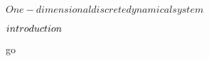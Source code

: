 \documentclass[../Main/main]{subfiles}
\begin{document}
\unit{ $ One-dimensional discrete dynamical system $ }
{
	\introduction
	{ 
		$introduction\\$ 
	}

	go

}
\end{document}
